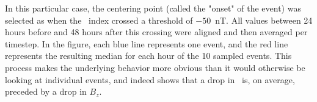 In this particular case, the centering point (called the "onset" of the event) was selected as when the \dst\ index crossed a threshold of $-50$~nT. All values between 24 hours before and 48 hours after this crossing were aligned and then averaged per timestep. In the figure, each blue line represents one event, and the red line represents the resulting median for each hour of the 10 sampled events. This process makes the underlying behavior more obvious than it would otherwise be looking at individual events, and indeed shows that a drop in \dst\ is, on average, preceded by a drop in $B_z$. 



